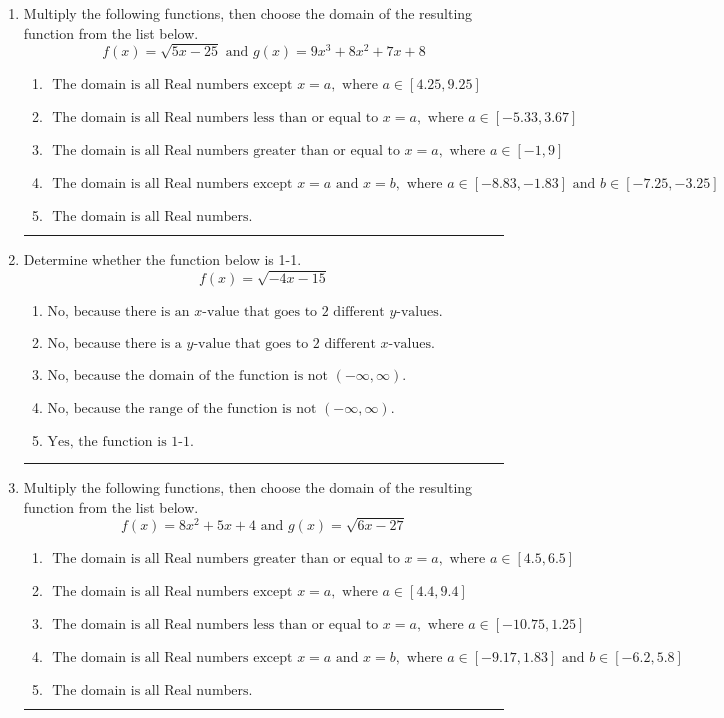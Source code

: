 \documentclass[14pt]{extbook}
\newcommand{\litem}[1]{\item#1\hspace*{-1cm}\rule{\textwidth}{0.4pt}}
\begin{document}
\begin{enumerate}
{\begin{enumerate}[label=\Alph*.]
\end{enumerate} }
\litem{
Multiply the following functions, then choose the domain of the resulting function from the list below.\[ f(x) = \sqrt{5x-25}  \text{ and } g(x) = 9x^{3} +8 x^{2} +7 x + 8 \]\begin{enumerate}[label=\Alph*.]
\item \( \text{ The domain is all Real numbers except } x = a, \text{ where } a \in [4.25, 9.25] \)
\item \( \text{ The domain is all Real numbers less than or equal to } x = a, \text{ where } a \in [-5.33, 3.67] \)
\item \( \text{ The domain is all Real numbers greater than or equal to } x = a, \text{ where } a \in [-1, 9] \)
\item \( \text{ The domain is all Real numbers except } x = a \text{ and } x = b, \text{ where } a \in [-8.83, -1.83] \text{ and } b \in [-7.25, -3.25] \)
\item \( \text{ The domain is all Real numbers. } \)

\end{enumerate} }
\litem{
Determine whether the function below is 1-1.\[ f(x) = \sqrt{-4 x - 15} \]\begin{enumerate}[label=\Alph*.]
\item \( \text{No, because there is an $x$-value that goes to 2 different $y$-values.} \)
\item \( \text{No, because there is a $y$-value that goes to 2 different $x$-values.} \)
\item \( \text{No, because the domain of the function is not $(-\infty, \infty)$.} \)
\item \( \text{No, because the range of the function is not $(-\infty, \infty)$.} \)
\item \( \text{Yes, the function is 1-1.} \)

\end{enumerate} }
\litem{
Multiply the following functions, then choose the domain of the resulting function from the list below.\[ f(x) = 8x^{2} +5 x + 4 \text{ and } g(x) = \sqrt{6x-27}  \]\begin{enumerate}[label=\Alph*.]
\item \( \text{ The domain is all Real numbers greater than or equal to } x = a, \text{ where } a \in [4.5, 6.5] \)
\item \( \text{ The domain is all Real numbers except } x = a, \text{ where } a \in [4.4, 9.4] \)
\item \( \text{ The domain is all Real numbers less than or equal to } x = a, \text{ where } a \in [-10.75, 1.25] \)
\item \( \text{ The domain is all Real numbers except } x = a \text{ and } x = b, \text{ where } a \in [-9.17, 1.83] \text{ and } b \in [-6.2, 5.8] \)
\item \( \text{ The domain is all Real numbers. } \)

\end{enumerate} }
\end{enumerate}
\end{document}
